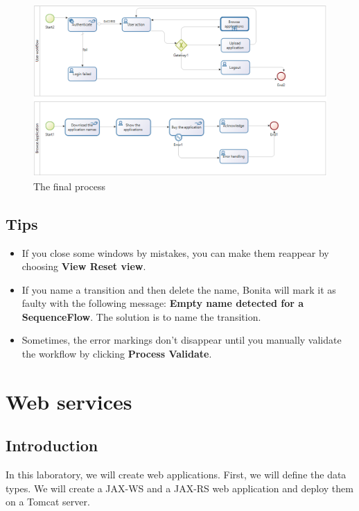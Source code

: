 \documentclass[]{report}
\let\Oldincludegraphics\includegraphics
\renewcommand{\includegraphics}[1]{
\begin{adjustbox}{max size={\textwidth}{\textheight}}
    \Oldincludegraphics[scale=0.6]{#1}%
\end{adjustbox}
}
\begin{document}
\begin{enumerate}
  \begin{figure}[htbp]
  \centering
  \includegraphics{img/bpmn/bonita_final_workflow.png}
  \caption{The final process}
  \end{figure}
\end{enumerate}

\section{Tips}

\begin{itemize}
\itemsep1pt\parskip0pt
\item
  If you close some windows by mistakes, you can make them reappear by
  choosing \textbf{View \textbar{} Reset view}.
\item
  If you name a transition and then delete the name, Bonita will mark it
  as faulty with the following message: \textbf{Empty name detected for
  a SequenceFlow}. The solution is to name the transition.
\item
  Sometimes, the error markings don't disappear until you manually
  validate the workflow by clicking \textbf{Process \textbar{}
  Validate}.
\end{itemize}

\chapter{Web services}

\section{Introduction}

In this laboratory, we will create web applications. First, we will
define the data types. We will create a JAX-WS and a JAX-RS web
application and deploy them on a Tomcat server.
\end{document}
